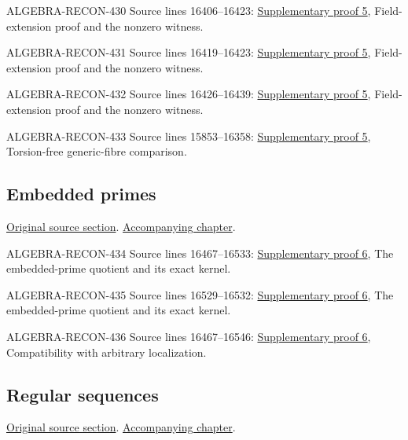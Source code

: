 \begin{AlgebraSourceRoutes}
\item[ALGEBRA-RECON-430] Source lines 16406--16423: \hyperlink{algebra_symbolic_weakass_notes_20260927}{Supplementary proof 5}, Field-extension proof and the nonzero witness.
\item[ALGEBRA-RECON-431] Source lines 16419--16423: \hyperlink{algebra_symbolic_weakass_notes_20260927}{Supplementary proof 5}, Field-extension proof and the nonzero witness.
\item[ALGEBRA-RECON-432] Source lines 16426--16439: \hyperlink{algebra_symbolic_weakass_notes_20260927}{Supplementary proof 5}, Field-extension proof and the nonzero witness.
\item[ALGEBRA-RECON-433] Source lines 15853--16358: \hyperlink{algebra_symbolic_weakass_notes_20260927}{Supplementary proof 5}, Torsion-free generic-fibre comparison.
\end{AlgebraSourceRoutes}

\subsection{Embedded primes}
\hypertarget{algebra-source-section-embedded-primes}{}
\noindent\href{https://github.com/stacks/stacks-project/blob/a04446e57ec1fbc252a871afcec7752fb2807b14/algebra.tex\#L16445}{Original source section}. \href{algebra.pdf\#nameddest=section-embedded-primes}{Accompanying chapter}.

\begin{AlgebraSourceRoutes}
\item[ALGEBRA-RECON-434] Source lines 16467--16533: \hyperlink{algebra_embedded_regular_notes_20260927}{Supplementary proof 6}, The embedded-prime quotient and its exact kernel.
\item[ALGEBRA-RECON-435] Source lines 16529--16532: \hyperlink{algebra_embedded_regular_notes_20260927}{Supplementary proof 6}, The embedded-prime quotient and its exact kernel.
\item[ALGEBRA-RECON-436] Source lines 16467--16546: \hyperlink{algebra_embedded_regular_notes_20260927}{Supplementary proof 6}, Compatibility with arbitrary localization.
\end{AlgebraSourceRoutes}

\subsection{Regular sequences}
\hypertarget{algebra-source-section-regular-sequences}{}
\noindent\href{https://github.com/stacks/stacks-project/blob/a04446e57ec1fbc252a871afcec7752fb2807b14/algebra.tex\#L16587}{Original source section}. \href{algebra.pdf\#nameddest=section-regular-sequences}{Accompanying chapter}.

